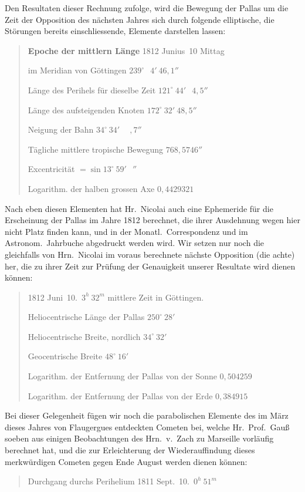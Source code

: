 \documentclass[12pt,a4paper]{book}
\begin{document}
Den Resultaten dieser Rechnung zufolge, wird die Bewegung der Pallas um die Zeit der Opposition des n\"achsten Jahres sich durch folgende elliptische, die St\"orungen bereits einschliessende, Elemente darstellen lassen:

\begin{quote}
\textbf{Epoche der mittlern L\"ange} 1812 Junius~10 Mittag

im Meridian von G\"ottingen \dotfill $239^{\circ}\ \phantom{0}4'\ 46{,}1''$

L\"ange des Perihels f\"ur dieselbe Zeit \dotfill $121^{\circ}\ 44'\ \phantom{0}4{,}5''$

L\"ange des aufsteigenden Knoten \dotfill $172^{\circ}\ 32'\ 48{,}5''$

Neigung der Bahn \dotfill $34^{\circ}\ 34'\ \phantom{0}\phantom{0}{,}7''$

T\"agliche mittlere tropische Bewegung \dotfill $768{,}5746''$

Excentricit\"at \dotfill $= \sin 13^{\circ}\ 59'\ \phantom{0}''$

Logarithm. der halben grossen Axe \dotfill $0{,}4429321$
\end{quote}

Nach eben diesen Elementen hat Hr.~Nicolai auch eine Ephemeride f\"ur die Erscheinung der Pallas im Jahre 1812 berechnet, die ihrer Ausdehnung wegen hier nicht Platz finden kann, und in der Monatl.~Correspondenz und im Astronom.~Jahrbuche abgedruckt werden wird. Wir setzen nur noch die gleichfalls von Hrn.~Nicolai im voraus berechnete n\"achste Opposition (die achte) her, die zu ihrer Zeit zur Pr\"ufung der Genauigkeit unserer Resultate wird dienen k\"onnen:

\begin{quote}
1812 Juni~10.\ $3^{h}\ 32^{m}$ mittlere Zeit in G\"ottingen.

Heliocentrische L\"ange der Pallas \dotfill $250^{\circ}\ 28'$

Heliocentrische Breite, nordlich \dotfill $34^{\circ}\ 32'$

Geocentrische Breite \dotfill $48^{\circ}\ 16'$

Logarithm. der Entfernung der Pallas von der Sonne \dotfill $0{,}504259$

Logarithm. der Entfernung der Pallas von der Erde \dotfill $0{,}384915$
\end{quote}

Bei dieser Gelegenheit f\"ugen wir noch die parabolischen Elemente des im M\"arz dieses Jahres von Flaugergues entdeckten Cometen bei, welche Hr.~Prof.~Gau{\ss} soeben aus einigen Beobachtungen des Hrn.~v.~Zach zu Marseille vorl\"aufig berechnet hat, und die zur Erleichterung der Wiederauffindung dieses merkw\"urdigen Cometen gegen Ende August werden dienen k\"onnen:

\begin{quote}
Durchgang durchs Perihelium 1811 Sept.~10.\ $0^{h}\ 51^{m}$
\end{quote}
\end{document}
